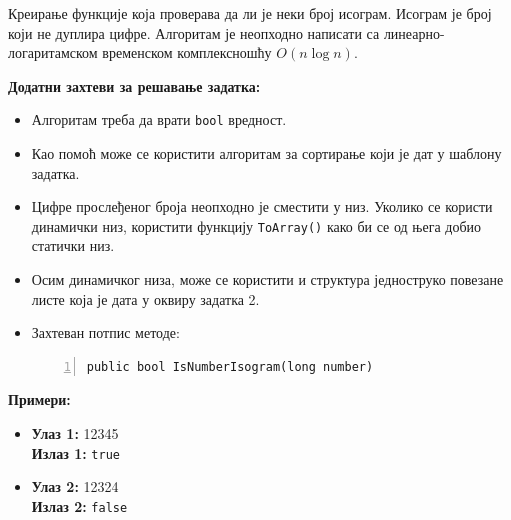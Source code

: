 Креирање функције која проверава да ли је неки број исограм. Исограм је број који не дуплира цифре. Алгоритам је неопходно написати са линеарно-логаритамском временском комплексношћу $O(n \log n)$.

\textbf{Додатни захтеви за решавање задатка:}
\begin{itemize}
    \item Алгоритам треба да врати \texttt{bool} вредност.
    \item Као помоћ може се користити алгоритам за сортирање који је дат у шаблону задатка.
    \item Цифре прослеђеног броја неопходно је сместити у низ. Уколико се користи динамички низ, користити функцију \texttt{ToArray()} како би се од њега добио статички низ.
    \item Осим динамичког низа, може се користити и структура једноструко повезане листе која је дата у оквиру задатка 2.
    \item Захтеван потпис методе:
    \begin{Verbatim}[fontsize=\footnotesize, numbers=left, xleftmargin=10mm]
public bool IsNumberIsogram(long number)
    \end{Verbatim}
\end{itemize}

\textbf{Примери:}
\begin{itemize}
    \item \textbf{Улаз 1:} 12345 \\
          \textbf{Излаз 1:} \texttt{true}
    \item \textbf{Улаз 2:} 12324 \\
          \textbf{Излаз 2:} \texttt{false}
\end{itemize}

